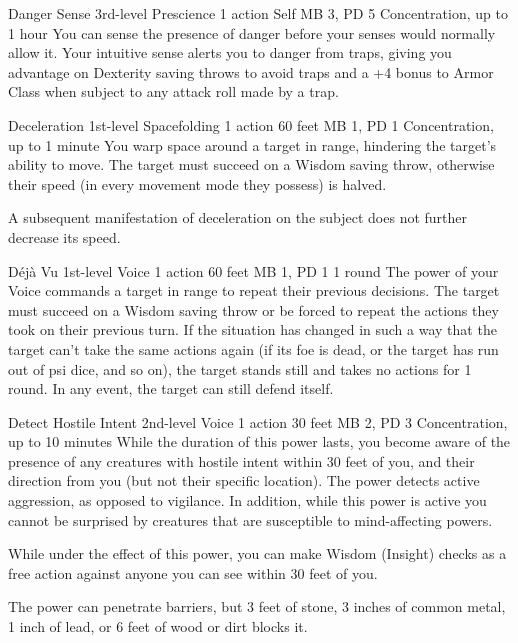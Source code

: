 \DndPowerHeader%
  {Danger Sense}
  {3rd-level Prescience}
  {1 action}
  {Self}
  {MB 3, PD 5}
  {Concentration, up to 1 hour}
  You can sense the presence of danger
  before your senses would normally allow it.
  Your intuitive sense alerts you to danger from traps,
  giving you advantage on Dexterity saving throws to avoid traps
  and a +4 bonus to Armor Class when subject to any attack roll
  made by a trap.

\DndPowerHeader%
  {Deceleration}
  {1st-level Spacefolding}
  {1 action}
  {60 feet}
  {MB 1, PD 1}
  {Concentration, up to 1 minute}
You warp space around a target in range,
hindering the target's ability to move.
The target must succeed on a Wisdom saving throw,
otherwise their speed (in every movement mode they possess) is halved.

A subsequent manifestation of deceleration on the subject
does not further decrease its speed.

\DndPowerHeader%
  {Déjà Vu}
  {1st-level Voice}
  {1 action}
  {60 feet}
  {MB 1, PD 1}
  {1 round}
The power of your Voice commands a target in range
to repeat their previous decisions.
The target must succeed on a Wisdom saving throw
or be forced to repeat the actions they took on their previous turn.
If the situation has changed in such a way that the target
can't take the same actions again
(if its foe is dead, or the target has run out of psi dice, and so on),
the target stands still and takes no actions for 1 round.
In any event, the target can still defend itself.

\DndPowerHeader%
  {Detect Hostile Intent}
  {2nd-level Voice}
  {1 action}
  {30 feet}
  {MB 2, PD 3}
  {Concentration, up to 10 minutes}
  While the duration of this power lasts,
  you become aware of the presence of any creatures with hostile intent
  within 30 feet of you,
  and their direction from you
  (but not their specific location).
  The power detects active aggression,
  as opposed to vigilance.
  In addition, while this power is active you cannot be surprised
  by creatures that are susceptible to mind-affecting powers.

  While under the effect of this power,
  you can make Wisdom (Insight) checks as a free action
  against anyone you can see within 30 feet of you.
  
  The power can penetrate barriers, but 3 feet of stone,
  3 inches of common metal,
  1 inch of lead,
  or 6 feet of wood or dirt blocks it.

